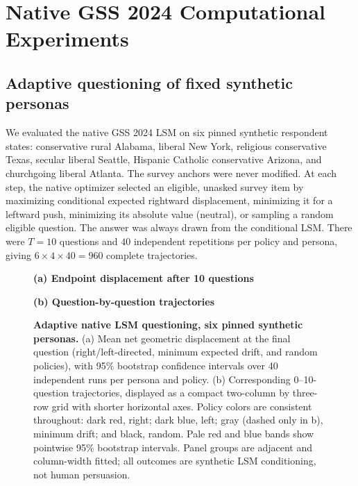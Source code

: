 \section{Native GSS 2024 Computational Experiments}
\label{sec:native}

\subsection{Adaptive questioning of fixed synthetic personas}
We evaluated the native GSS 2024 LSM on six pinned synthetic respondent
states: conservative rural Alabama, liberal New York, religious conservative
Texas, secular liberal Seattle, Hispanic Catholic conservative Arizona, and
churchgoing liberal Atlanta. The survey anchors were never modified.
At each step, the native optimizer selected an eligible, unasked survey item
by maximizing conditional expected rightward displacement, minimizing it for a
leftward push, minimizing its absolute value (neutral), or sampling a random
eligible question. The answer was always drawn from the conditional LSM.
There were $T=10$ questions and $40$ independent repetitions per policy and
persona, giving $6\times4\times40=960$ complete trajectories.

\begin{figure}[!t]
\centering
\begin{minipage}[t]{.487\textwidth}
\centering\vspace{0pt}
{\footnotesize\bfseries (a) Endpoint displacement after 10 questions}\par
\vspace{1mm}

\end{minipage}\hfill
\begin{minipage}[t]{.487\textwidth}
\centering\vspace{0pt}
{\footnotesize\bfseries (b) Question-by-question trajectories}\par
\vspace{1mm}

\end{minipage}
\caption{\textbf{Adaptive native LSM questioning, six pinned synthetic personas.}
(a) Mean net geometric displacement at the final question (right/left-directed,
minimum expected drift, and random policies), with 95\% bootstrap
confidence intervals over 40 independent runs per persona and policy.
(b) Corresponding 0--10-question trajectories, displayed as a compact
two-column by three-row grid with shorter horizontal axes.
Policy colors are consistent throughout: dark red, right; dark blue,
left; gray (dashed only in b), minimum drift; and black, random.
Pale red and blue bands show pointwise 95\% bootstrap intervals.
Panel groups are adjacent and column-width fitted; all outcomes are
synthetic LSM conditioning, not human persuasion.}
\label{fig:persona-endpoints}
\label{fig:native-trajectories}
\end{figure}

